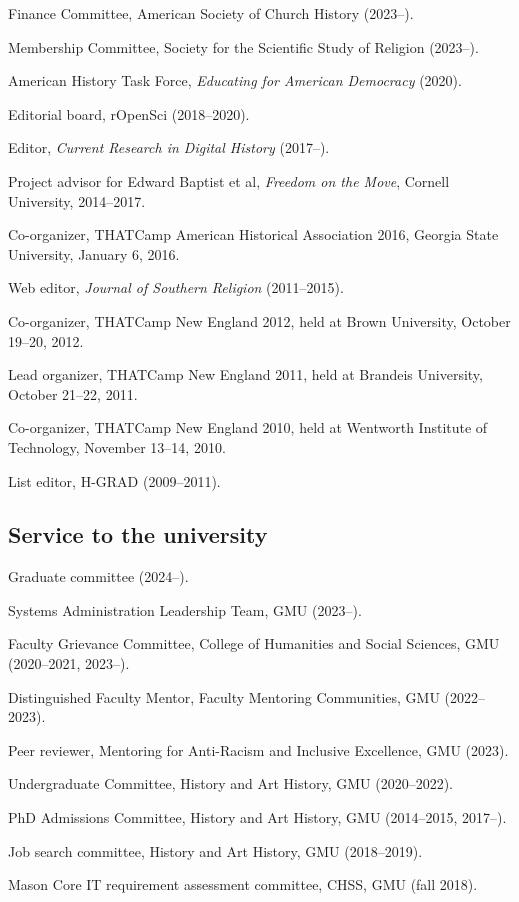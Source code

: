 \documentclass[11pt]{article}
\begin{document}
Finance Committee, American Society of Church History (2023--).

Membership Committee, Society for the Scientific Study of Religion (2023--).

American History Task Force, \emph{Educating for American Democracy} (2020).

Editorial board, rOpenSci (2018--2020).

Editor, \emph{Current Research in Digital History} (2017--).

Project advisor for Edward Baptist et al, \emph{Freedom on the Move}, Cornell University, 2014--2017.

Co-organizer, THATCamp American Historical Association 2016, Georgia State University, January 6, 2016.

Web editor, \emph{Journal of Southern Religion} (2011--2015).

Co-organizer, THATCamp New England 2012, held at Brown University, October 19--20, 2012.

Lead organizer, THATCamp New England 2011, held at Brandeis University, October 21--22, 2011.

Co-organizer, THATCamp New England 2010, held at Wentworth Institute of Technology, November 13--14, 2010.

List editor, H-GRAD (2009--2011).

\subsection{Service to the university}\label{Service to the university}

Graduate committee (2024--).

Systems Administration Leadership Team, GMU (2023--).

Faculty Grievance Committee, College of Humanities and Social Sciences, GMU 
(2020--2021, 2023--).

Distinguished Faculty Mentor, Faculty Mentoring Communities, GMU (2022--2023).

Peer reviewer, Mentoring for Anti-Racism and Inclusive Excellence, GMU (2023).

Undergraduate Committee, History and Art History, GMU (2020--2022).

PhD Admissions Committee, History and Art History, GMU (2014--2015, 2017--).

Job search committee, History and Art History, GMU (2018--2019).

Mason Core IT requirement assessment committee, CHSS, GMU (fall 2018).
\end{document}
